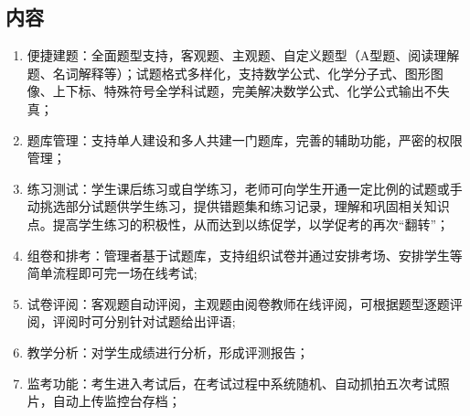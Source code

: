 \subsection{内容}
\begin{enumerate}
	\item 便捷建题：全面题型支持，客观题、主观题、自定义题型（A型题、阅读理解题、名词解释等）；试题格式多样化，支持数学公式、化学分子式、图形图像、上下标、特殊符号全学科试题，完美解决数学公式、化学公式输出不失真；
	\item 题库管理：支持单人建设和多人共建一门题库，完善的辅助功能，严密的权限管理；
	\item 练习测试：学生课后练习或自学练习，老师可向学生开通一定比例的试题或手动挑选部分试题供学生练习，提供错题集和练习记录，理解和巩固相关知识点。提高学生练习的积极性，从而达到以练促学，以学促考的再次“翻转”；
	\item 组卷和排考：管理者基于试题库，支持组织试卷并通过安排考场、安排学生等简单流程即可完一场在线考试;
	\item 试卷评阅：客观题自动评阅，主观题由阅卷教师在线评阅，可根据题型逐题评阅，评阅时可分别针对试题给出评语;
	\item 教学分析：对学生成绩进行分析，形成评测报告；
	\item 监考功能：考生进入考试后，在考试过程中系统随机、自动抓拍五次考试照片，自动上传监控台存档；
\end{enumerate}




